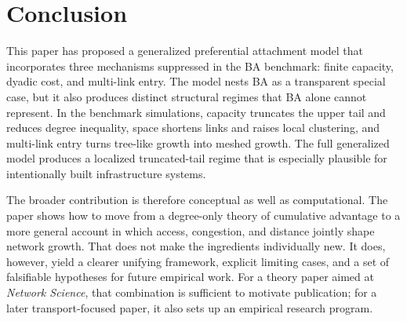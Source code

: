 \documentclass[11pt]{article}
\begin{document}
\section{Conclusion}

This paper has proposed a generalized preferential attachment model that incorporates three mechanisms suppressed in the BA benchmark: finite capacity, dyadic cost, and multi-link entry. The model nests BA as a transparent special case, but it also produces distinct structural regimes that BA alone cannot represent. In the benchmark simulations, capacity truncates the upper tail and reduces degree inequality, space shortens links and raises local clustering, and multi-link entry turns tree-like growth into meshed growth. The full generalized model produces a localized truncated-tail regime that is especially plausible for intentionally built infrastructure systems.

The broader contribution is therefore conceptual as well as computational. The paper shows how to move from a degree-only theory of cumulative advantage to a more general account in which access, congestion, and distance jointly shape network growth. That does not make the ingredients individually new. It does, however, yield a clearer unifying framework, explicit limiting cases, and a set of falsifiable hypotheses for future empirical work. For a theory paper aimed at \emph{Network Science}, that combination is sufficient to motivate publication; for a later transport-focused paper, it also sets up an empirical research program.



\end{document}
